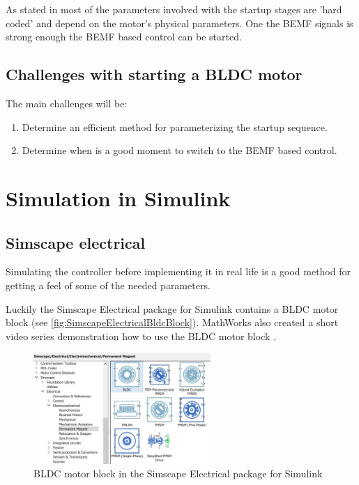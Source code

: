 \documentclass[]{report}
\begin{document}
As stated in \cite{ST_Starting_Sequence_BLDC} most of the parameters involved with the startup stages are 'hard coded' and depend on the motor's physical parameters. One the BEMF signals is strong enough the BEMF based control can be started.

\subsection{Challenges with starting a BLDC motor}
The main challenges will be:
\begin{enumerate}
	\item Determine an efficient method for parameterizing the startup sequence.
	\item Determine when is a good moment to switch to the BEMF based control.
\end{enumerate}

\section{Simulation in Simulink}
\subsection{Simscape electrical}
Simulating the controller before implementing it in real life is a good method for getting a feel of some of the needed parameters.

Luckily the Simscape Electrical package for Simulink contains a BLDC motor block \cite{SimscapeElectrical_BLDC} (see \autoref{fig:SimscapeElectricalBldcBlock}). MathWorks also created a short video series demonstration how to use the BLDC motor block \cite{SimscapeElectrical_BLDC_VideoSeries}. 

\begin{figure}[H]
	\includegraphics[width=0.6\textwidth]{SimscapeElectricalBldcBlock.JPG}
	\caption{BLDC motor block in the Simscape Electrical package for Simulink}
	\label{fig:SimscapeElectricalBldcBlock}
\end{figure}
\end{document}
